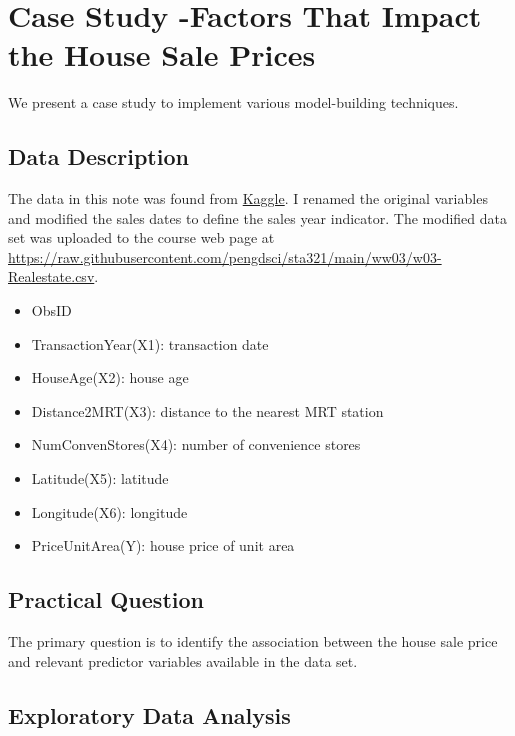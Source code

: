 \documentclass[
]{book}
\providecommand{\tightlist}{%
  \setlength{\itemsep}{0pt}\setlength{\parskip}{0pt}}
\begin{document}
\hypertarget{case-study--factors-that-impact-the-house-sale-prices}{%
\section{Case Study -Factors That Impact the House Sale Prices}\label{case-study--factors-that-impact-the-house-sale-prices}}

We present a case study to implement various model-building techniques.

\hypertarget{data-description-1}{%
\subsection{Data Description}\label{data-description-1}}

The data in this note was found from \href{https://www.kaggle.com/}{Kaggle}. I renamed the original variables and modified the sales dates to define the sales year indicator. The modified data set was uploaded to the course web page at \url{https://raw.githubusercontent.com/pengdsci/sta321/main/ww03/w03-Realestate.csv}.

\begin{itemize}
\tightlist
\item
  ObsID
\item
  TransactionYear(X1): transaction date
\item
  HouseAge(X2): house age\\
\item
  Distance2MRT(X3): distance to the nearest MRT station
\item
  NumConvenStores(X4): number of convenience stores
\item
  Latitude(X5): latitude\\
\item
  Longitude(X6): longitude\\
\item
  PriceUnitArea(Y): house price of unit area
\end{itemize}

\hypertarget{practical-question-1}{%
\subsection{Practical Question}\label{practical-question-1}}

The primary question is to identify the association between the house sale price and relevant predictor variables available in the data set.

\hypertarget{exploratory-data-analysis-1}{%
\subsection{Exploratory Data Analysis}\label{exploratory-data-analysis-1}}
\end{document}
